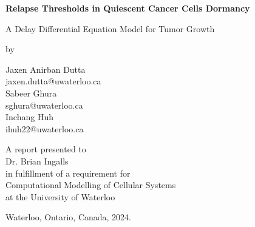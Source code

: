 \pagestyle{empty}

\begin{titlepage}
        \begin{center}
        \vspace*{2cm}

        \Huge
        {
        \bf 
        Relapse Thresholds in Quiescent Cancer Cells Dormancy \\
        }

        \LARGE
        {A Delay Differential Equation Model for Tumor Growth}

        \vspace*{2cm}

        \normalsize
        by \\

        \vspace*{1.0cm}

        \Large
        Jaxen Anirban Dutta \\
        \normalsize
        jaxen.dutta@uwaterloo.ca \\

        \Large
        Sabeer Ghura \\
        \normalsize
        sghura@uwaterloo.ca \\
        
        \Large
        Inchang Huh \\
        \normalsize
        ihuh22@uwaterloo.ca \\

        \vspace*{1.25cm}

        A report presented to \\
        Dr. Brian Ingalls \\ 
        in fulfillment of a requirement for \\
        Computational Modelling of Cellular Systems \\
        at the University of Waterloo \\

        \vspace*{1cm}

        Waterloo, Ontario, Canada, 2024. \\
        
        \end{center}
\end{titlepage}

